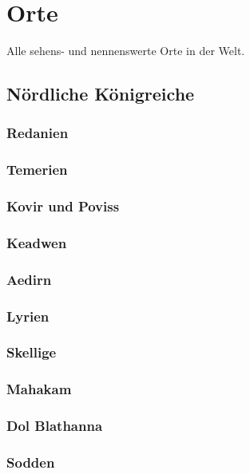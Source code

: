 {\let\clearpage\relax\chapter{Orte}}
Alle sehens- und nennenswerte Orte in der Welt.

\section{Nördliche Königreiche}

\subsection{Redanien}

\subsection{Temerien}

\subsection{Kovir und Poviss}

\subsection{Keadwen}

\subsection{Aedirn}

\subsection{Lyrien}

\subsection{Skellige}

\subsection{Mahakam}

\subsection{Dol Blathanna}

\subsection{Sodden}

